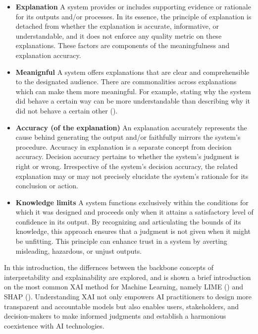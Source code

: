 \documentclass[binding=0.6cm]{sapthesis}
\newcommand{\mycite}[1]{(\cite{#1})}
\begin{document}
\begin{itemize}
    \item \textbf{Explanation} A system provides or includes supporting evidence or rationale for its outputs and/or processes. In its essence, the principle of explanation is detached from whether the explanation is accurate, informative, or understandable, and it does not enforce any quality metric on these explanations. These factors are components of the meaningfulness and explanation accuracy.
    
    \item \textbf{Meanignful} A system offers explanations that are clear and comprehensible to the designated audience. There are commonalities across explanations which can make them more meaningful. For example, stating why the system did behave a certain way can be more understandable than describing why it did not behave a certain other \mycite{lim2009-expl-why-not}.
    
    \item \textbf{Accuracy (of the explanation)} An explanation accurately represents the cause behind generating the output and/or faithfully mirrors the system's procedure. Accuracy in explanation is a separate concept from decision accuracy. Decision accuracy pertains to whether the system's judgment is right or wrong. Irrespective of the system's decision accuracy, the related explanation may or may not precisely elucidate the system's rationale for its conclusion or action.
    
    \item \textbf{Knowledge limits} A system functions exclusively within the conditions for which it was designed and proceeds only when it attains a satisfactory level of confidence in its output. By recognizing and articulating the bounds of its knowledge, this approach ensures that a judgment is not given when it might be unfitting. This principle can enhance trust in a system by averting misleading, hazardous, or unjust outputs.
\end{itemize}

In this introduction, the differnces between the backbone concepts of interpretability and explainability are explored, and is shown a brief introduction on the most common XAI method for Machine Learning, namely LIME \mycite{ribeiro2016-lime} and SHAP \mycite{lundberg2017-shap}. Understanding XAI not only empowers AI practitioners to design more transparent and accountable models but also enables users, stakeholders, and decision-makers to make informed judgments and establish a harmonious coexistence with AI technologies.
\end{document}
